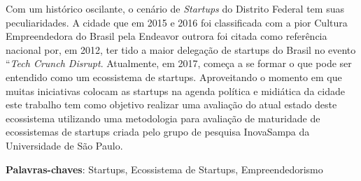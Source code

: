 \begin{resumo}

Com um histórico oscilante, o cenário de \textit{Startups} do Distrito Federal tem suas peculiaridades. A cidade que em 2015 e 2016 foi classificada com a pior Cultura Empreendedora do Brasil pela Endeavor outrora foi citada como referência nacional por, em 2012, ter tido a maior delegação de startups do Brasil no evento ``\textit{Tech Crunch Disrupt}. Atualmente, em 2017, começa a se formar o que pode ser entendido como um ecossistema de startups. Aproveitando o momento em que muitas iniciativas colocam as startups na agenda política e midiática da cidade este trabalho tem como objetivo realizar uma avaliação do atual estado deste ecossistema utilizando uma metodologia para avaliação de maturidade de ecossistemas de startups criada pelo grupo de pesquisa InovaSampa da Universidade de São Paulo.

 \vspace{\onelineskip}

 \noindent
 \textbf{Palavras-chaves}: Startups, Ecossistema de Startups, Empreendedorismo
\end{resumo}
